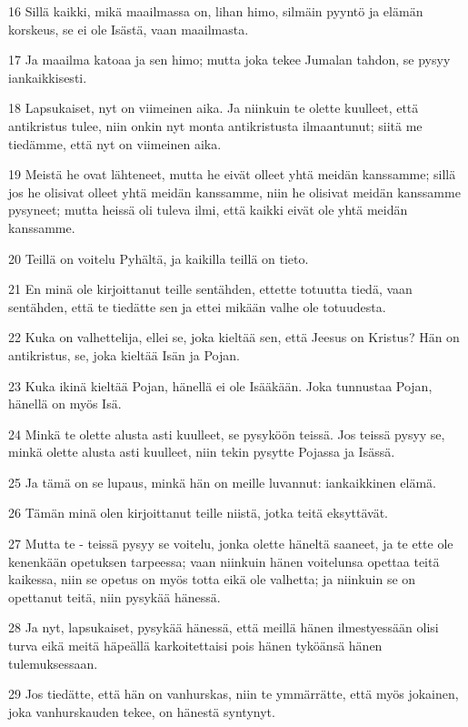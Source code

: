 \par 16 Sillä kaikki, mikä maailmassa on, lihan himo, silmäin pyyntö ja elämän korskeus, se ei ole Isästä, vaan maailmasta.
\par 17 Ja maailma katoaa ja sen himo; mutta joka tekee Jumalan tahdon, se pysyy iankaikkisesti.
\par 18 Lapsukaiset, nyt on viimeinen aika. Ja niinkuin te olette kuulleet, että antikristus tulee, niin onkin nyt monta antikristusta ilmaantunut; siitä me tiedämme, että nyt on viimeinen aika.
\par 19 Meistä he ovat lähteneet, mutta he eivät olleet yhtä meidän kanssamme; sillä jos he olisivat olleet yhtä meidän kanssamme, niin he olisivat meidän kanssamme pysyneet; mutta heissä oli tuleva ilmi, että kaikki eivät ole yhtä meidän kanssamme.
\par 20 Teillä on voitelu Pyhältä, ja kaikilla teillä on tieto.
\par 21 En minä ole kirjoittanut teille sentähden, ettette totuutta tiedä, vaan sentähden, että te tiedätte sen ja ettei mikään valhe ole totuudesta.
\par 22 Kuka on valhettelija, ellei se, joka kieltää sen, että Jeesus on Kristus? Hän on antikristus, se, joka kieltää Isän ja Pojan.
\par 23 Kuka ikinä kieltää Pojan, hänellä ei ole Isääkään. Joka tunnustaa Pojan, hänellä on myös Isä.
\par 24 Minkä te olette alusta asti kuulleet, se pysyköön teissä. Jos teissä pysyy se, minkä olette alusta asti kuulleet, niin tekin pysytte Pojassa ja Isässä.
\par 25 Ja tämä on se lupaus, minkä hän on meille luvannut: iankaikkinen elämä.
\par 26 Tämän minä olen kirjoittanut teille niistä, jotka teitä eksyttävät.
\par 27 Mutta te - teissä pysyy se voitelu, jonka olette häneltä saaneet, ja te ette ole kenenkään opetuksen tarpeessa; vaan niinkuin hänen voitelunsa opettaa teitä kaikessa, niin se opetus on myös totta eikä ole valhetta; ja niinkuin se on opettanut teitä, niin pysykää hänessä.
\par 28 Ja nyt, lapsukaiset, pysykää hänessä, että meillä hänen ilmestyessään olisi turva eikä meitä häpeällä karkoitettaisi pois hänen tyköänsä hänen tulemuksessaan.
\par 29 Jos tiedätte, että hän on vanhurskas, niin te ymmärrätte, että myös jokainen, joka vanhurskauden tekee, on hänestä syntynyt.

